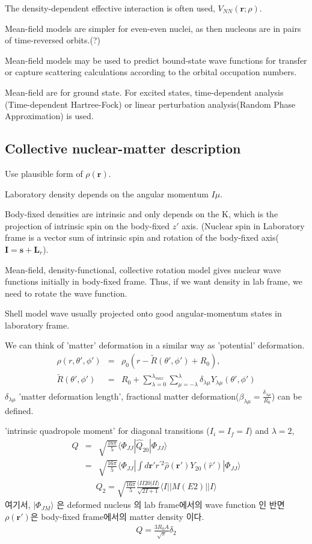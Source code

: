 \documentclass[11pt]{book}
\def\bm{\boldsymbol}
\def\vr{{\bm r}}
\def\la{\langle}
\def\ra{\rangle}
\newcommand{\bea}{\begin{eqnarray}}
\newcommand{\eea}{\end{eqnarray}}
\newcommand{\no}{\nonumber \\}
\begin{document}
The density-dependent effective interaction is often used, $V_{NN}(\vr;\rho)$.

Mean-field models are simpler for even-even nuclei, as then nucleons are in pairs
of time-reversed orbits.(?) 

Mean-field models may be used to predict bound-state wave functions for transfer or capture scattering calculations according to the orbital occupation numbers. 

Mean-field are for ground state. For excited states, time-dependent analysis
(Time-dependent Hartree-Fock)
or linear perturbation analysis(Random Phase Approximation) is used.


\subsection{Collective nuclear-matter description}
Use plausible form of $\rho(\vr)$.

Laboratory density depends on the angular momentum $I\mu$.

Body-fixed densities are intrinsic and only depends on the K, which is the projection of intrinsic spin on the body-fixed $z'$ axis.
(Nuclear spin in Laboratory frame is a vector 
sum of intrinsic spin and rotation of the body-fixed axis(${\bm I}={\bm s}+{\bm L}_r$).   

Mean-field, density-functional, 
collective rotation model gives nuclear wave functions initially in body-fixed frame.
Thus, if we want density in lab frame, we need to rotate the wave function. 

Shell model wave usually projected onto good angular-momentum states in laboratory frame. 

We can think of 'matter' deformation in a similar way as 'potential' deformation. 
\bea
\rho(r,\theta',\phi')&=&\rho_0(r-\tilde{R}(\theta',\phi')+R_0),\no 
\tilde{R}(\theta',\phi')&=&R_0
 +\sum_{\lambda=0}^{\lambda_{max}}\sum_{\mu=-\lambda}^{\lambda}\delta_{\lambda\mu}Y_{\lambda\mu}(\theta',\phi')
\eea
$\delta_{\lambda\mu}$ 'matter deformation length', 
fractional matter deformation($\beta_{\lambda\mu}=\frac{\delta_{\lambda\mu}}{R_0}$)
can be defined. 

'intrinsic quadropole moment' for diagonal transitions ($I_i=I_f=I$) and $\lambda=2$,
\bea 
Q&=&\sqrt{\frac{16\pi}{5}}\la \Phi_{JJ}|\hat{Q}_{20}|\Phi_{JJ}\ra \no 
 &=&\sqrt{\frac{16\pi}{5}}\la \Phi_{JJ}|\int d\vr' r^{'2}\hat{\rho}(\vr')Y_{20}(\hat{r}')|\Phi_{JJ}\ra
\eea
\bea 
Q_2= \sqrt{\frac{16\pi}{5}} \frac{\la I I 20|II\ra}{\sqrt{2I+1}}\la I|| M(E2)||I\ra 
\eea 
여기서, $|\Phi_{JM}\ra $ 은 deformed nucleus 의 lab frame에서의 wave function
인 반면 $\rho(\vr')$은 body-fixed frame에서의 matter density 이다.  
\bea 
Q=\frac{3R_0 A}{\sqrt{\pi}}\delta_{2}
\eea 
\end{document}
